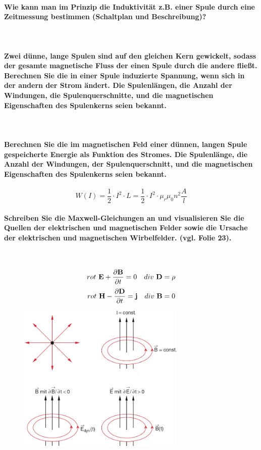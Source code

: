 \documentclass[a4paper, 11pt, parskip=half]{scrartcl}
\begin{document}
\paragraph{Wie kann man im Prinzip die Induktivität z.B. einer Spule durch eine Zeitmessung
bestimmen (Schaltplan und Beschreibung)?} ~

\paragraph{Zwei dünne, lange Spulen sind auf den gleichen Kern gewickelt, sodass der gesamte
magnetische Fluss der einen Spule durch die andere fließt. Berechnen Sie die in einer Spule
induzierte Spannung, wenn sich in der andern der Strom ändert. Die Spulenlängen, die Anzahl der
Windungen, die Spulenquerschnitte, und die magnetischen Eigenschaften des Spulenkerns seien
bekannt.} ~

\paragraph{Berechnen Sie die im magnetischen Feld einer dünnen, langen Spule gespeicherte Energie
als Funktion des Stromes. Die Spulenlänge, die Anzahl der Windungen, der Spulenquerschnitt, und die
magnetischen Eigenschaften des Spulenkerns seien bekannt.}

\begin{equation}
    W(I) = \frac{1}{2} \cdot I^2 \cdot L = \frac{1}{2} \cdot I^2 \cdot \mu_r \mu_0 n^2 \frac{A}{l}
\end{equation}

\paragraph{Schreiben Sie die Maxwell-Gleichungen an und visualisieren Sie die Quellen der
elektrischen und magnetischen Felder sowie die Ursache der elektrischen und magnetischen
Wirbelfelder. (vgl. Folie 23).} ~

\begin{equation}
    rot~\bold{E} + \pdv{\bold{B}}{t} = 0 ~~~ div~\bold{D} = \rho
\end{equation}
\begin{equation}
    rot~\bold{H} - \pdv{\bold{D}}{t} = \bold{j} ~~~ div~\bold{B} = 0
\end{equation}

\begin{figure}[H]
    \centering
    \includegraphics[width=8cm]{image/7/13}
\end{figure}
\end{document}
